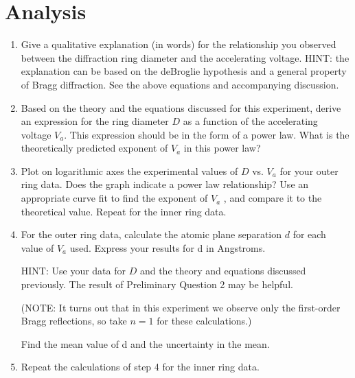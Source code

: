 \section{Analysis}

\begin{enumerate}
\item Give a qualitative explanation (in words) for the relationship you
observed between the diffraction ring diameter and the accelerating
voltage.  HINT:  the explanation can be based on the deBroglie
hypothesis and a general property of Bragg diffraction.  See the above
equations and accompanying discussion.

\item Based on the theory and the equations discussed for this experiment,
derive an expression for the ring diameter $D$ as a function of the accelerating voltage
$V_a$. This expression should be in the form of a power
law.  What is the theoretically predicted exponent of
$V_a$ in this power law?

\item Plot on logarithmic axes the experimental values of $D$ vs.
$V_a$ for your outer ring data. Does the graph indicate a power law relationship?  Use an appropriate curve
fit to find the exponent of $V_a$ , and compare it to the
theoretical value.  Repeat for the inner ring data.

\item For the outer ring data, calculate the atomic plane separation $d$ for
each value of $V_a$ used. Express your results for d in Angstroms.

HINT: Use your data for $D$ and the theory and equations discussed
previously.  The result of Preliminary Question 2 may be helpful.

(NOTE: It turns out that in this experiment we observe only the
first-order Bragg reflections, so take $n = 1$ for these calculations.)

Find the mean value of d and the uncertainty in the mean.

\item Repeat the calculations of step 4 for the inner ring data.


\end{enumerate}
